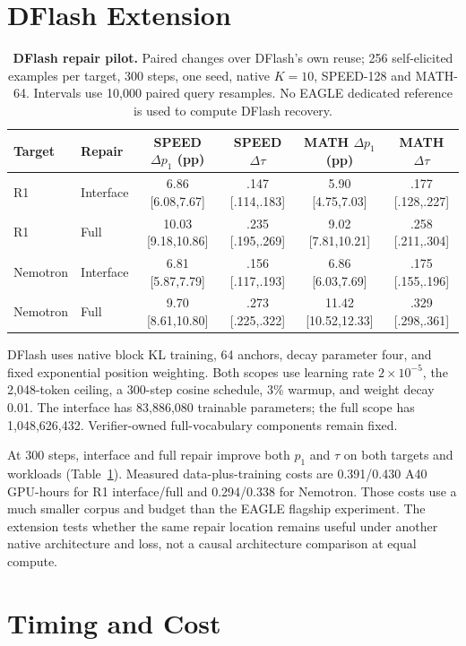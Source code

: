 \section{DFlash Extension}
\label{app:dflash}
\begin{table}[t]
\centering\small
\begin{tabular}{@{}llcccc@{}}
\toprule
Target & Repair & SPEED $\Delta p_1$ (pp) & SPEED $\Delta\tau$ & MATH $\Delta p_1$ (pp) & MATH $\Delta\tau$ \\
\midrule
R1 & Interface & 6.86 [6.08,7.67] & .147 [.114,.183] & 5.90 [4.75,7.03] & .177 [.128,.227] \\
R1 & Full & 10.03 [9.18,10.86] & .235 [.195,.269] & 9.02 [7.81,10.21] & .258 [.211,.304] \\
Nemotron & Interface & 6.81 [5.87,7.79] & .156 [.117,.193] & 6.86 [6.03,7.69] & .175 [.155,.196] \\
Nemotron & Full & 9.70 [8.61,10.80] & .273 [.225,.322] & 11.42 [10.52,12.33] & .329 [.298,.361] \\
\bottomrule
\end{tabular}
\caption{\textbf{DFlash repair pilot.} Paired changes over DFlash's own reuse; 256 self-elicited examples per target, 300 steps, one seed, native $K=10$, SPEED-128 and MATH-64. Intervals use 10,000 paired query resamples. No EAGLE dedicated reference is used to compute DFlash recovery.}
\label{tab:dflash}
\end{table}

DFlash uses native block KL training, 64 anchors, decay parameter four, and fixed exponential position weighting. Both scopes use learning rate $2\times10^{-5}$, the 2,048-token ceiling, a 300-step cosine schedule, 3\% warmup, and weight decay 0.01. The interface has 83,886,080 trainable parameters; the full scope has 1,048,626,432. Verifier-owned full-vocabulary components remain fixed.

At 300 steps, interface and full repair improve both $p_1$ and $\tau$ on both targets and workloads (Table~\ref{tab:dflash}). Measured data-plus-training costs are 0.391/0.430 A40 GPU-hours for R1 interface/full and 0.294/0.338 for Nemotron. Those costs use a much smaller corpus and budget than the EAGLE flagship experiment. The extension tests whether the same repair location remains useful under another native architecture and loss, not a causal architecture comparison at equal compute.

\section{Timing and Cost}
\label{app:timing}
\begin{table}[t]
\centering\small
\setlength{\tabcolsep}{4pt}

\caption{\textbf{Measured A40 timing.} All ratios are relative to target-only decoding on paired query panels. Warm results average three passes within each of three processes. Startup-inclusive results charge engine loading/compilation plus the first panel. Batch one uses 32 queries, batch eight 128. Intervals jointly resample process pairs and query batches.}
\label{tab:timing}
\end{table}

